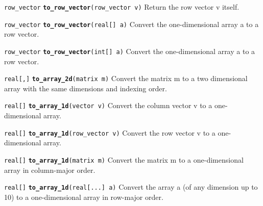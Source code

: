 \documentclass[
  10pt,
]{book}
\begin{document}

\texttt{row\_vector} \textbf{\texttt{to\_row\_vector}}\texttt{(row\_vector\ v)}\newline
Return the row vector v itself.


\texttt{row\_vector} \textbf{\texttt{to\_row\_vector}}\texttt{(real{[}{]}\ a)}\newline
Convert the one-dimensional array a to a row vector.


\texttt{row\_vector} \textbf{\texttt{to\_row\_vector}}\texttt{(int{[}{]}\ a)}\newline
Convert the one-dimensional array a to a row vector.


\texttt{real{[},{]}} \textbf{\texttt{to\_array\_2d}}\texttt{(matrix\ m)}\newline
Convert the matrix m to a two dimensional array with the same
dimensions and indexing order.


\texttt{real{[}{]}} \textbf{\texttt{to\_array\_1d}}\texttt{(vector\ v)}\newline
Convert the column vector v to a one-dimensional array.


\texttt{real{[}{]}} \textbf{\texttt{to\_array\_1d}}\texttt{(row\_vector\ v)}\newline
Convert the row vector v to a one-dimensional array.


\texttt{real{[}{]}} \textbf{\texttt{to\_array\_1d}}\texttt{(matrix\ m)}\newline
Convert the matrix m to a one-dimensional array in column-major order.


\texttt{real{[}{]}} \textbf{\texttt{to\_array\_1d}}\texttt{(real{[}...{]}\ a)}\newline
Convert the array a (of any dimension up to 10) to a one-dimensional
array in row-major order.
\end{document}
